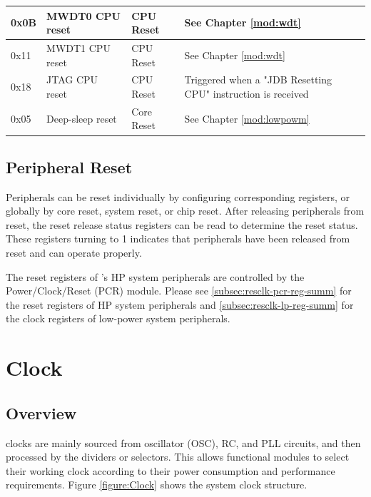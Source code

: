 \documentclass[main\_\_EN.tex]{subfiles}
\begin{document}
\begin{ThreePartTable}
\begin{longtable}[c]{ |l|m{3.5cm}|m{1.8cm}|m{9.2cm}| }
        \hline
        0x0B & MWDT0 CPU reset & CPU Reset & See Chapter \ref{mod:wdt} \textit{\nameref{mod:wdt}}
        \\\hline
        0x11 & MWDT1 CPU reset & CPU Reset & See Chapter \ref{mod:wdt} \textit{\nameref{mod:wdt}}
        \\\hline
        0x18 & JTAG CPU reset & CPU Reset & Triggered when a "JDB Resetting CPU" instruction is received
        \\\hline
        0x05 & Deep-sleep reset & Core Reset & See Chapter \ref{mod:lowpowm} \textit{\nameref{mod:lowpowm}}
        \\\hline
\end{longtable}
\end{ThreePartTable}


\subsection{Peripheral Reset}

Peripherals can be reset individually by configuring corresponding registers, or globally by core reset, system reset, or chip reset. After releasing peripherals from reset, the reset release status registers can be read to determine the reset status. These registers turning to 1 indicates that peripherals have been released from reset and can operate properly.

The reset registers of \chipname{}'s HP system peripherals are controlled by the Power/Clock/Reset (PCR) module. Please see \ref{subsec:resclk-pcr-reg-summ} \textit{} for the reset registers of HP system peripherals and \ref{subsec:resclk-lp-reg-summ} \textit{} for the clock registers of low-power system peripherals.

\section{Clock}

\subsection{Overview}

\chipname{} clocks are mainly sourced from oscillator (OSC), RC, and PLL circuits, and then processed by the dividers or selectors. This allows functional modules to select their working clock according to their power consumption and performance requirements. Figure \ref{figure:Clock} shows the system clock structure.
\end{document}
